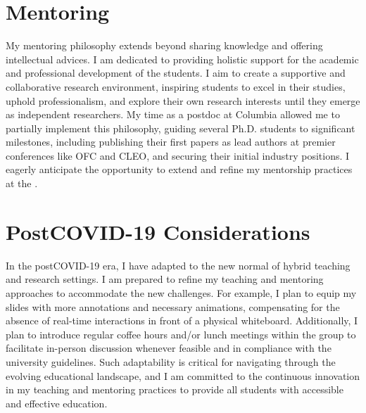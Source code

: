 \section{Mentoring}
My mentoring philosophy extends beyond sharing knowledge and offering intellectual advices. I am dedicated to providing holistic support for the academic and professional development of the students. I aim to create a supportive and collaborative research environment, inspiring students to excel in their studies, uphold professionalism, and explore their own research interests until they emerge as independent researchers. My time as a postdoc at Columbia allowed me to partially implement this philosophy, guiding several Ph.D. students to significant milestones, including publishing their first papers as lead authors at premier conferences like OFC and CLEO, and securing their initial industry positions. I eagerly anticipate the opportunity to extend and refine my mentorship practices at the \appSchool{}.

\section{Post\textendash COVID-19 Considerations}

In the post\textendash COVID-19 era, I have adapted to the new normal of hybrid teaching and research settings. I am prepared to refine my teaching and mentoring approaches to accommodate the new challenges. For example, I plan to equip my slides with more annotations and necessary animations, compensating for the absence of real-time interactions in front of a physical whiteboard. Additionally, I plan to introduce regular coffee hours and/or lunch meetings within the group to facilitate in-person discussion whenever feasible and in compliance with the university guidelines. Such adaptability is critical for navigating through the evolving educational landscape, and I am committed to the continuous innovation in my teaching and mentoring practices to provide all students with accessible and effective education.
